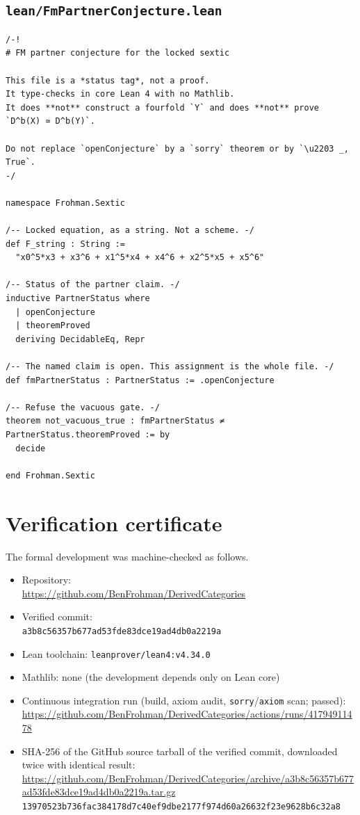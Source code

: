 \documentclass[11pt]{amsart}
\theoremstyle{definition}
\theoremstyle{remark}
\begin{document}
\subsection*{\texttt{lean/FmPartnerConjecture.lean}}
\begin{verbatim}
/-!
# FM partner conjecture for the locked sextic

This file is a *status tag*, not a proof.
It type-checks in core Lean 4 with no Mathlib.
It does **not** construct a fourfold `Y` and does **not** prove
`D^b(X) ≃ D^b(Y)`.

Do not replace `openConjecture` by a `sorry` theorem or by `\u2203 _, True`.
-/

namespace Frohman.Sextic

/-- Locked equation, as a string. Not a scheme. -/
def F_string : String :=
  "x0^5*x3 + x3^6 + x1^5*x4 + x4^6 + x2^5*x5 + x5^6"

/-- Status of the partner claim. -/
inductive PartnerStatus where
  | openConjecture
  | theoremProved
  deriving DecidableEq, Repr

/-- The named claim is open. This assignment is the whole file. -/
def fmPartnerStatus : PartnerStatus := .openConjecture

/-- Refuse the vacuous gate. -/
theorem not_vacuous_true : fmPartnerStatus ≠ PartnerStatus.theoremProved := by
  decide

end Frohman.Sextic
\end{verbatim}

\section{Verification certificate}\label{app:verification-certificate}

The formal development was machine-checked as follows.

{\raggedright
\begin{itemize}
\item Repository:\\ {\footnotesize\url{https://github.com/BenFrohman/DerivedCategories}}
\item Verified commit:\\ {\footnotesize\texttt{a3b8c56357b677ad53fde83dce19ad4db0a2219a}}
\item Lean toolchain: \texttt{leanprover/lean4:v4.34.0}
\item Mathlib: none (the development depends only on Lean core)
\item Continuous integration run (build, axiom audit, \texttt{sorry}/\texttt{axiom} scan; passed):\\ {\footnotesize\url{https://github.com/BenFrohman/DerivedCategories/actions/runs/41794911478}}
\item SHA-256 of the GitHub source tarball of the verified commit, downloaded twice with identical result:\\ {\footnotesize\url{https://github.com/BenFrohman/DerivedCategories/archive/a3b8c56357b677ad53fde83dce19ad4db0a2219a.tar.gz}}\\
{\footnotesize\texttt{13970523b736fac384178d7c40ef9dbe2177f974d60a26632f23e9628b6c32a8}}
\end{itemize}\par}
\end{document}

